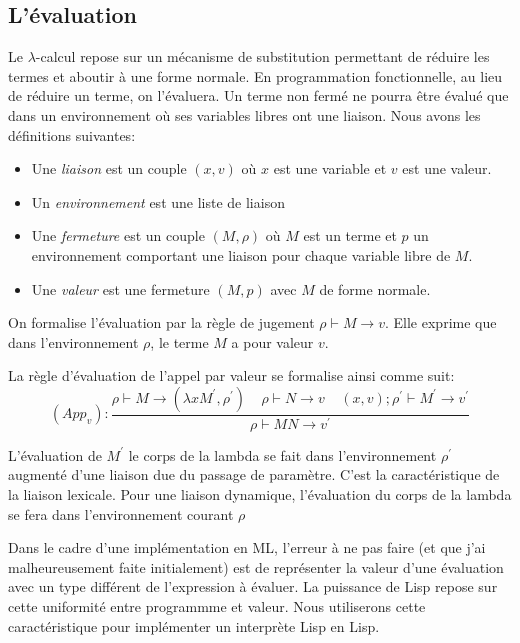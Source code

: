 \subsection{L'évaluation}
Le $\lambda$-calcul repose sur un mécanisme de substitution permettant de réduire les termes et
aboutir à une forme normale. En programmation fonctionnelle, au lieu de réduire un terme, on
l'évaluera. Un terme non fermé ne pourra être évalué que dans un environnement où ses 
variables libres ont une liaison. Nous avons les définitions suivantes:
\begin{itemize}
	\item Une \textit{liaison} est un couple $(x,v)$ où $x$ est une variable et $v$ est une valeur.
	\item Un \textit{environnement} est une liste de liaison
	\item Une \textit{fermeture} est un couple $(M,\rho)$ où $M$ est un terme et $p$ un environnement 
	comportant une liaison pour chaque variable libre de $M$.
	\item Une \textit{valeur} est une fermeture $(M,p)$ avec $M$ de forme normale.
\end{itemize}
On formalise l'évaluation par la règle de jugement $\rho \vdash M \rightarrow v$. Elle exprime
que dans l'environnement $\rho$, le terme $M$ a pour valeur $v$.

La règle d'évaluation de l'appel par valeur se formalise ainsi comme suit:
\[(App_v): \frac{\rho \vdash M \rightarrow (\lambda x M^{'} , \rho ^{'} )  
		\ \ \ \ \ \rho \vdash N \rightarrow v \ \ \ \ \ (x,v);\rho ^{'} \vdash M^{'} \rightarrow v^{'} }
		 { \rho \vdash M N \rightarrow v^{'} }
\]

L'évaluation de $M^{'}$ le corps de la lambda se fait dans l'environnement $\rho ^{'}$ augmenté 
d'une liaison due du passage de paramètre. C'est la caractéristique de la liaison lexicale.
Pour  une liaison dynamique, l'évaluation du corps de la lambda se fera  dans l'environnement
courant $\rho$

Dans le cadre d'une implémentation en ML, l'erreur à ne pas faire (et que j'ai malheureusement faite initialement) est de
représenter la valeur d'une évaluation avec un type différent de l'expression à évaluer.
La puissance de Lisp repose sur  cette uniformité entre programmme et valeur. Nous utiliserons cette caractéristique pour
implémenter un interprète Lisp en Lisp.

